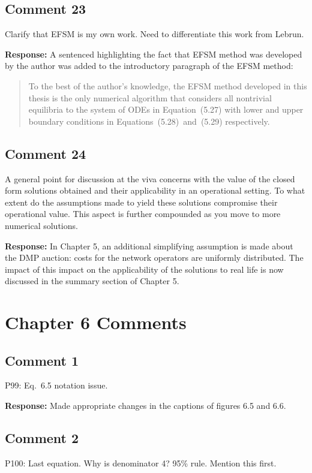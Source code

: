 \documentclass[10pt,a4paper,notitlepage]{article}
\numberwithin{equation}{section}
\begin{document}
\subsection{Comment 23}
Clarify that EFSM is my own work. Need to differentiate this work from Lebrun.

\textbf{Response:}
A sentenced highlighting the fact that EFSM method was developed by the author was added to the introductory paragraph of the EFSM method:
\begin{quote}
To the best of the author's knowledge, the EFSM method developed in this thesis is the only numerical algorithm that considers all nontrivial equilibria to the system of ODEs in Equation~(5.27) with lower and upper boundary conditions in Equations~(5.28)~and~(5.29) respectively.
\end{quote}

\subsection{Comment 24}
A general point for discussion at the viva concerns with the value of the closed form solutions obtained and their applicability in an operational setting. To what extent do the assumptions made to yield these solutions compromise their operational value. This aspect is further compounded as you move to more numerical solutions.

\textbf{Response:}
In Chapter 5, an additional simplifying assumption is made about the DMP auction: costs for the network operators are uniformly distributed. The impact of this impact on the applicability of the solutions to real life is now discussed in the summary section of Chapter 5.

\clearpage

\section{Chapter 6 Comments}
\subsection{Comment 1}
P99: Eq.~6.5 notation issue.

\textbf{Response:}
Made appropriate changes in the captions of figures 6.5 and 6.6.

\subsection{Comment 2}
P100: Last equation. Why is denominator 4? 95\% rule. Mention this first.
\end{document}
